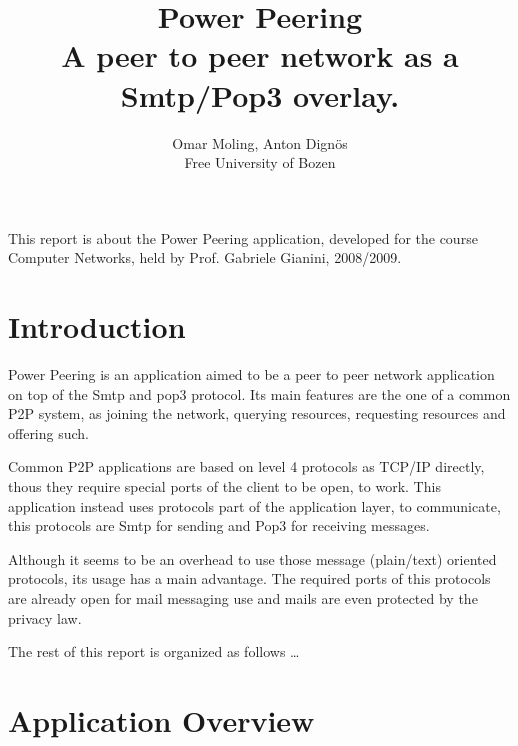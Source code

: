 \documentclass{article}
\begin{document}
\title{Power Peering \\ A peer to peer network as a Smtp/Pop3 overlay.}

\author{Omar Moling, Anton Dign\"{o}s \\ Free University of Bozen}

\date{}

\maketitle

\noindent
This report is about the Power Peering application, developed for the course
Computer Networks, held by Prof. Gabriele Gianini, 2008/2009.

\section{Introduction}

Power Peering is an application aimed to be a peer to peer network application
on top of the Smtp and pop3 protocol. Its main features are the one of a common
P2P system, as joining the network, querying resources, requesting resources
and offering such. 

Common P2P applications are based on level 4 protocols as
TCP/IP directly, thous they require special ports of the client to be open, to
work. This application instead uses protocols part of the application layer, to
communicate, this protocols are Smtp for sending and Pop3 for receiving
messages. 

Although it seems to be an overhead to use those message (plain/text)
oriented protocols, its usage has a main advantage. The required ports of this
protocols are already open for mail messaging use and mails are even protected
by the privacy law.

The rest of this report is organized as follows \ldots 


\section{Application Overview}
\end{document}
